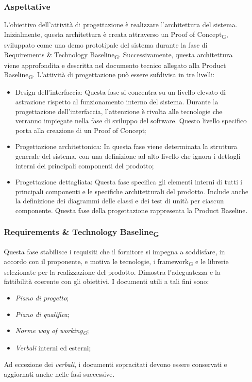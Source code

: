 \documentclass{article}
\begin{document}
\subsubsection*{Aspettative}
L'obiettivo dell'attività di progettazione è realizzare l'architettura del sistema. Inizialmente, questa architettura è creata attraverso un Proof of Concept\textsubscript{G}, sviluppato come una demo prototipale del sistema durante la fase di Requirements \& Technology Baseline\textsubscript{G}. Successivamente, questa architettura viene approfondita e descritta nel documento tecnico allegato alla Product Baseline\textsubscript{G}. L'attività di progettazione può essere sufdivisa in tre livelli:
\begin{itemize}
    \item Design dell’interfaccia: Questa fase si concentra su un livello elevato di astrazione rispetto al funzionamento interno del sistema. Durante la progettazione dell'interfaccia, l'attenzione è rivolta alle tecnologie che verranno impiegate nella fase di sviluppo del software. Questo livello specifico porta alla creazione di un Proof of Concept;
    \item Progettazione architettonica: In questa fase viene determinata la struttura generale del sistema, con una definizione ad alto livello che ignora i dettagli interni dei principali componenti del prodotto;
    \item Progettazione dettagliata: Questa fase specifica gli elementi interni di tutti i principali componenti e le specifiche architetturali del prodotto. Include anche la definizione dei diagrammi delle classi e dei test di unità per ciascun componente. Questa fase della progettazione rappresenta la Product Baseline.
\end{itemize}
\subsubsection*{Requirements \& Technology Baseline\textsubscript{G}}
Questa fase stabilisce i requisiti che il fornitore si impegna a soddisfare, in accordo con il proponente, e motiva le tecnologie, i framework\textsubscript{G} e le librerie selezionate per la realizzazione del prodotto. Dimostra l'adeguatezza e la fattibilità coerente con gli obiettivi. I documenti utili a tali fini sono:
\begin{itemize}
    \item \textit{Piano di progetto};
    \item \textit{Piano di qualifica};
    \item \textit{Norme way of working\textsubscript{G}};
    \item \textit{Verbali} interni ed esterni;
\end{itemize}
Ad eccezione dei \textit{verbali}, i documenti sopracitati devono essere conservati e aggiornati anche nelle fasi successive.
\end{document}
